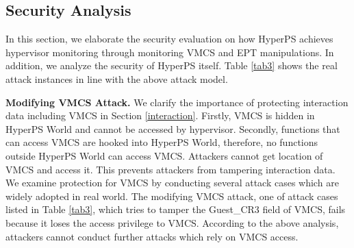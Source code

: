 ﻿\documentclass[conference]{IEEEtran}
\begin{document}
\subsection{Security Analysis}
 
In this section, we elaborate the security evaluation on how HyperPS achieves hypervisor monitoring through monitoring VMCS and EPT manipulations. 
In addition, we analyze the security of HyperPS itself. Table \ref{tab3} shows the real attack instances in line with the above attack model. 



\textbf{Modifying VMCS Attack.}
We clarify the importance of protecting interaction data including VMCS in Section \ref{interaction}.
 Firstly, VMCS is hidden in HyperPS World and cannot be accessed by hypervisor. Secondly, functions that can access VMCS are hooked into HyperPS World, therefore, no functions outside HyperPS World can access VMCS. Attackers cannot get location of VMCS and access it. This prevents attackers from tampering interaction data. We examine protection for VMCS by conducting several attack cases which are widely adopted in real world. 
The modifying VMCS attack, one of attack cases listed in Table \ref{tab3}, which tries to tamper the Guest\_CR3 field of VMCS, fails because it loses the access privilege to VMCS. According to the above analysis, attackers cannot conduct further attacks which rely on VMCS access.
\end{document}
